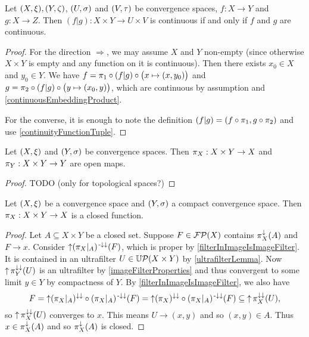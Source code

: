 \begin{lemma} \label{continuityParallelComposition}
Let $\sSet{X,\xi}, \sSet{Y,\zeta}$, $\sSet{U,\sigma}$ and $\sSet{V,\tau}$ be convergence spaces, $f: X\to Y$ and $g: X\to Z$. Then $(f|g): X\times Y \to U\times V$ is continuous \textup{if and only if} $f$ and $g$ are continuous.
\end{lemma}
\begin{proof}
For the direction $\Rightarrow$, we may assume $X$ and $Y$ non-empty (since otherwise $X\times Y$ is empty and any function on it is continuous). Then there exists $x_0\in X$ and $y_0\in Y$. We have $f = \pi_1\circ (f|g) \circ \big(x\mapsto (x,y_0)\big)$ and $g = \pi_2\circ (f|g) \circ \big(y\mapsto (x_0, y)\big)$, which are continuous by assumption and \ref{continuousEmbeddingProduct}.

For the converse, it is enough to note the definition $(f|g) = (f\circ \pi_1, g\circ \pi_2)$ and use \ref{continuityFunctionTuple}.
\end{proof}

\begin{lemma}
Let $\sSet{X,\xi}$ and $\sSet{Y,\sigma}$ be convergence spaces. Then $\pi_X: X\times Y\to X$ and $\pi_Y: X\times Y\to Y$ are open maps.
\end{lemma}
\begin{proof}
TODO (only for topological spaces?)
\end{proof}

\begin{lemma} \label{projectionClosedFunction}
Let $\sSet{X,\xi}$ be a convergence space and $\sSet{Y,\sigma}$ a compact convergence space. Then $\pi_X: X\times Y\to X$ is a closed function.
\end{lemma}
\begin{proof}
Let $A\subseteq X\times Y$ be a closed set. Suppose $F\in \operatorname{\mathcal{FP}}(X)$ contains $\pi_X^\downarrow(A)$ and $F\to x$. Consider $\operatorname{\uparrow}(\pi_X|_A)^{{\text{\hspace{0.15em}-}\downarrow}\downarrow}(F)$, which is proper by \ref{filterInImageIsImageFilter}. It is contained in an ultrafilter $U\in\operatorname{\mathbb{U}\mathcal{P}}(X\times Y)$ by \ref{ultrafilterLemma}. Now $\operatorname{\uparrow}\pi_Y^{\downarrow\downarrow}(U)$ is an ultrafilter by \ref{imageFilterProperties} and thus convergent to some limit $y\in Y$ by compactness of $Y$. By \ref{filterInImageIsImageFilter}, we also have
\[ F = \operatorname{\uparrow}(\pi_X|_A)^{\downarrow\downarrow}\circ(\pi_X|_A)^{{\text{\hspace{0.15em}-}\downarrow}\downarrow}(F) = \operatorname{\uparrow}(\pi_X)^{\downarrow\downarrow}\circ(\pi_X|_A)^{{\text{\hspace{0.15em}-}\downarrow}\downarrow}(F) \subseteq \operatorname{\uparrow}\pi_X^{\downarrow\downarrow}(U), \]
so $\operatorname{\uparrow}\pi_X^{\downarrow\downarrow}(U)$ converges to $x$. This means $U\to (x,y)$ and so $(x,y)\in A$. Thus $x\in \pi_X^\downarrow(A)$ and so $\pi_X^\downarrow(A)$ is closed.
\end{proof}

